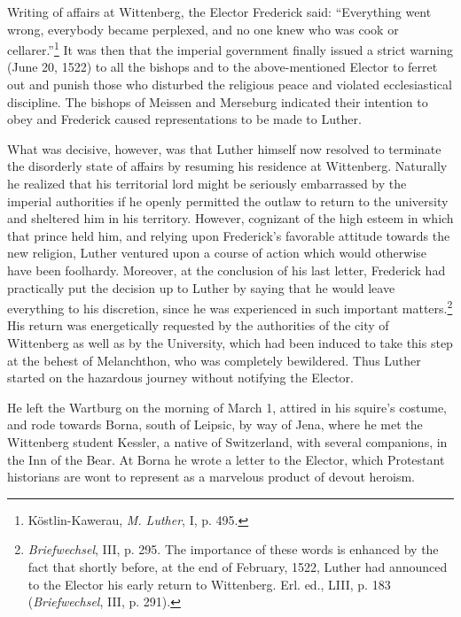 Writing of affairs at Wittenberg, the Elector Frederick said:
“Everything went wrong, everybody became perplexed, and no one
knew who was cook or cellarer.”\footnote{Köstlin-Kawerau, \textit{M. Luther}, I, p. 495.}
It was then that the imperial government
finally issued a strict warning (June 20, 1522) to all the
bishops and to the above-mentioned Elector to ferret out and punish
those who disturbed the religious peace and violated ecclesiastical discipline.
The bishops of Meissen and Merseburg indicated their intention to obey
and Frederick caused representations to be made to
Luther.

What was decisive, however, was that Luther himself now resolved
to terminate the disorderly state of affairs by resuming his residence
at Wittenberg. Naturally he realized that his territorial lord might
be seriously embarrassed by the imperial authorities if he openly
permitted the outlaw to return to the university and sheltered him
in his territory. However, cognizant of the high esteem in which that
prince held him, and relying upon Frederick’s favorable attitude
towards the new religion, Luther ventured upon a course of action
which would otherwise have been foolhardy. Moreover, at the conclusion
of his last letter, Frederick had practically put the decision
up to Luther by saying that he would leave everything to his discretion,
since he was experienced in such important matters.\footnote
{\textit{Briefwechsel}, III, p. 295. The importance of these words is enhanced by the fact
that shortly before, at the end of February, 1522, Luther had announced to the Elector his
early return to Wittenberg. Erl. ed., LIII, p. 183 (\textit{Briefwechsel}, III, p. 291).}
His return was energetically requested by the authorities of the city of
Wittenberg as well as by the University, which had been induced to
take this step at the behest of Melanchthon, who was completely bewildered.
Thus Luther started on the hazardous journey without
notifying the Elector.

He left the Wartburg on the morning of March 1, attired in his
squire’s costume, and rode towards Borna, south of Leipsic, by way of
Jena, where he met the Wittenberg student Kessler, a native of
Switzerland, with several companions, in the Inn of the Bear. At
Borna he wrote a letter to the Elector, which Protestant historians
are wont to represent as a marvelous product of devout heroism.

